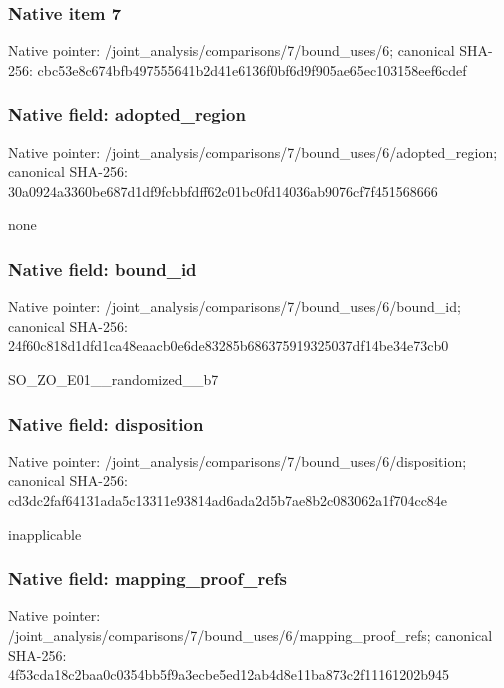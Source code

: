 \documentclass[10pt,a4paper]{article}
\begin{document}
\subsubsection{Native item 7}
Native pointer: /joint\_\allowbreak{}analysis/comparisons/7/bound\_\allowbreak{}uses/6; canonical SHA-256: cbc53e8c674bfb497555641b2d41e6136f0bf6d9f905ae65ec103158eef6cdef

\subsubsection{Native field: adopted\_\allowbreak{}region}
Native pointer: /joint\_\allowbreak{}analysis/comparisons/7/bound\_\allowbreak{}uses/6/adopted\_\allowbreak{}region; canonical SHA-256: 30a0924a3360be687d1df9fcbbfdff62c01bc0fd14036ab9076cf7f451568666

\begingroup\raggedright\sloppy none\par\endgroup

\subsubsection{Native field: bound\_\allowbreak{}id}
Native pointer: /joint\_\allowbreak{}analysis/comparisons/7/bound\_\allowbreak{}uses/6/bound\_\allowbreak{}id; canonical SHA-256: 24f60c818d1dfd1ca48eaacb0e6de83285b686375919325037df14be34e73cb0

\begingroup\raggedright\sloppy SO\_\allowbreak{}ZO\_\allowbreak{}E01\_\allowbreak{}\_\allowbreak{}randomized\_\allowbreak{}\_\allowbreak{}b7\par\endgroup

\subsubsection{Native field: disposition}
Native pointer: /joint\_\allowbreak{}analysis/comparisons/7/bound\_\allowbreak{}uses/6/disposition; canonical SHA-256: cd3dc2faf64131ada5c13311e93814ad6ada2d5b7ae8b2c083062a1f704cc84e

\begingroup\raggedright\sloppy inapplicable\par\endgroup

\subsubsection{Native field: mapping\_\allowbreak{}proof\_\allowbreak{}refs}
Native pointer: /joint\_\allowbreak{}analysis/comparisons/7/bound\_\allowbreak{}uses/6/mapping\_\allowbreak{}proof\_\allowbreak{}refs; canonical SHA-256: 4f53cda18c2baa0c0354bb5f9a3ecbe5ed12ab4d8e11ba873c2f11161202b945
\end{document}
